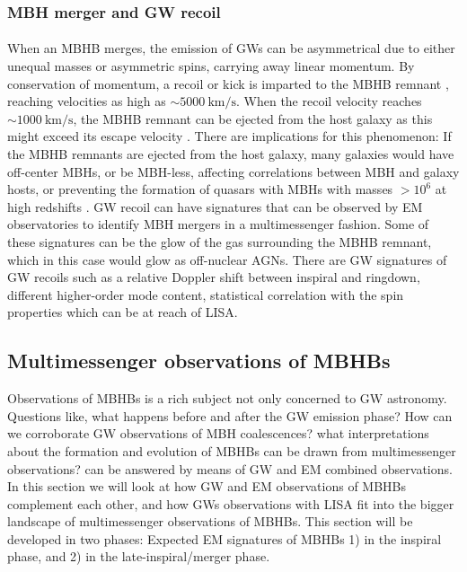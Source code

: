 \documentclass[a4paper,12pt]{article}
\begin{document}
\subsubsection{MBH merger and GW recoil}

\paragraph{}
When an MBHB merges, the emission of GWs can be asymmetrical due to either unequal masses or asymmetric spins, carrying away linear momentum. By conservation of momentum, a recoil or kick is imparted to the MBHB remnant \cite{bonnor1961transport,peres1962classical,bekenstein1973black}, reaching velocities as high as $\sim 5000~\mathrm{km/s}$. When the recoil velocity reaches $\sim1000~\mathrm{km/s}$, the MBHB remnant can be ejected from the host galaxy as this might exceed its escape velocity \cite{redmount1989gravitational,merritt2004consequences,gerosa2015missing}. There are implications for this phenomenon: If the MBHB remnants are ejected from the host galaxy, many galaxies would have off-center MBHs, or be MBH-less, affecting correlations between MBH and galaxy hosts, or preventing the formation of quasars with MBHs with masses $>10^{6}$ at high redshifts \cite{haiman2004constraints,boylan2004core,sesana2007extreme,gualandris2008ejection}. 
GW recoil can have signatures that can be observed by EM observatories to identify MBH mergers in a multimessenger fashion. Some of these signatures can be the glow of the gas surrounding the MBHB remnant, which in this case would glow as off-nuclear AGNs.
There are GW signatures of GW recoils such as a relative Doppler shift between inspiral and ringdown\cite{gerosa2016black}, different higher-order mode content\cite{calderon2018tracking}, statistical correlation with the spin properties \cite{varma2020extracting} which can be at reach of LISA.


\subsection{Multimessenger observations of MBHBs}
\label{subsec:MMOsinMBHBs}

Observations of MBHBs is a rich subject not only concerned to GW astronomy. Questions like, what happens before and after the GW emission phase? How can we corroborate GW observations of MBH coalescences? what interpretations about the formation and evolution of MBHBs can be drawn from multimessenger observations? can be answered by means of GW and EM combined observations. In this section we will look at how GW and EM observations of MBHBs complement each other, and how GWs observations with LISA fit into the bigger landscape of multimessenger observations of MBHBs. This section will be developed in two phases: Expected EM signatures of MBHBs 1) in the inspiral phase, and 2) in the late-inspiral/merger phase.
\end{document}
